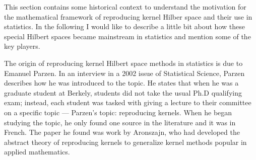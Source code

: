 This section contains some historical context to understand the motivation for the mathematical framework of reproducing kernel Hilber space and their use in statistics. In the following I would like to describe a little bit about how these special Hilbert spaces became mainstream in statistics and mention some of the key players. 


The origin of reproducing kernel Hilbert space methods in statistics is due to Emanuel Parzen. In an interview in a 2002 issue of Statistical Science, Parzen describes how he was introduced to the topic. He states that when he was a graduate student at Berkely, students did not take the usual Ph.D qualifying exam; instead, each student was tasked with giving a lecture to their committee on a specific topic --- Parzen's topic: reproducing kernels. When he began studying the topic, he only found one source in the literature and it was in French. The paper he found was work by Aronszajn, who had developed the abstract theory of reproducing kernels to generalize kernel methods popular in applied mathematics. 

